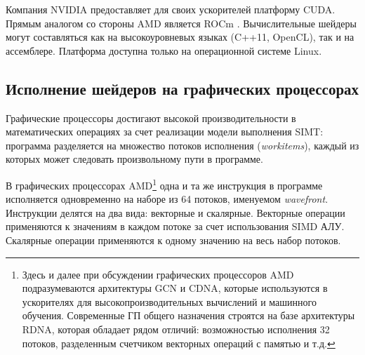 \documentclass[a4paper,14pt]{extarticle}
\begin{document}
Компания NVIDIA предоставляет для своих ускорителей платформу CUDA. Прямым аналогом
со стороны AMD является ROCm \cite{rocm}. Вычислительные шейдеры могут составляться как
на высокоуровневых языках (C++11, OpenCL), так и на ассемблере. Платформа доступна
только на операционной системе Linux.

\subsection{Исполнение шейдеров на графических процессорах}

Графические процессоры достигают высокой производительности в математических операциях
за счет реализации модели выполнения SIMT: программа разделяется на множество
потоков исполнения (\textit{workitems}), каждый из которых может следовать произвольному пути в программе.

В графических процессорах AMD\footnote{Здесь и далее при обсуждении графических процессоров AMD
подразумеваются архитектуры GCN и CDNA, которые используются в ускорителях для высокопроизводительных
вычислений и машинного обучения. Современные ГП общего назначения строятся на базе архитектуры RDNA,
которая обладает рядом отличий: возможностью исполнения 32 потоков, разделенным счетчиком векторных
операций с памятью и т.д.}
одна и та же инструкция в программе исполняется одновременно на наборе из 64 потоков,
именуемом \textit{wavefront}. Инструкции делятся на два вида: векторные и скалярные.
Векторные операции применяются к значениям в каждом потоке за счет использования SIMD АЛУ.
Скалярные операции применяются к одному значению на весь набор потоков.
\end{document}

